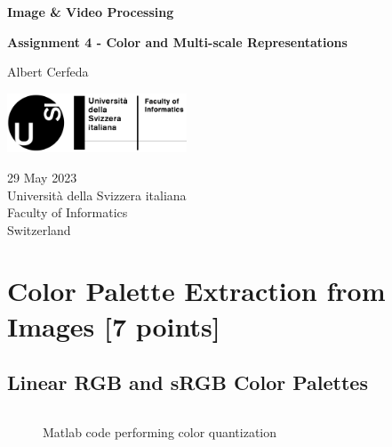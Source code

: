 \documentclass[tikz,14pt,fleqn]{article}
\newcommand\namesurname{Albert Cerfeda}
\newcommand\assignment{Assignment 4 - Color and Multi-scale Representations}
\newcommand\subject{Image \& Video Processing}
\newcommand\documentdate{29 May 2023}
\begin{document}
\begin{titlepage}
   \begin{center}
       \vspace*{0.2cm}

       \textbf{\Large{\subject}}

       \vspace{0.5cm}
        \textbf{\assignment}\\[5mm]
        
            
       \vspace{0.4cm}

        \namesurname
        \begin{figure}[H]
            \centering
        \end{figure}
       \tableofcontents

       \vspace*{\fill}
     
        \includegraphics[width=0.4\textwidth]{fig/logo.png}
       
        \documentdate \\
        Università della Svizzera italiana\\
        Faculty of Informatics\\
        Switzerland\\

   \end{center}
\end{titlepage}

\section{Color Palette Extraction from Images [7 points]}
\subsection{Linear RGB and sRGB Color Palettes}

\begin{figure}[h!]
    \vspace*{-0.2cm}
    \inputminted[firstline=90, frame=lines, framesep=2mm, fontsize=\small ]{matlab}{../src/ex1.m}
    \vspace*{-0.5cm}
    \caption{Matlab code performing color quantization}
\end{figure}
\end{document}
